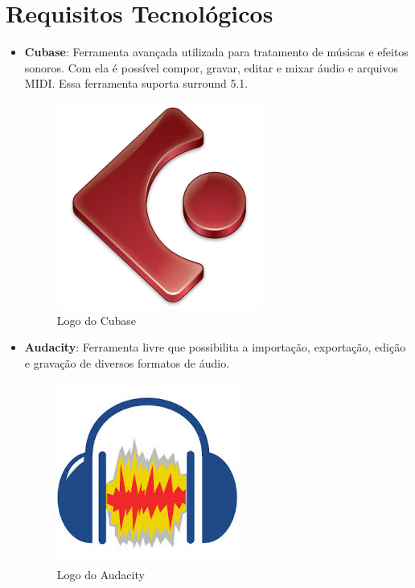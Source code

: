 \documentclass[11pt]{article} %
\begin{document}
\section{Requisitos Tecnológicos}

\begin{itemize}

\item \textbf{Cubase}: Ferramenta avançada utilizada para tratamento de músicas e efeitos sonoros. Com ela é possível compor, gravar, editar e mixar áudio e arquivos MIDI. Essa ferramenta suporta surround 5.1.

\begin{figure}[!htp]
\centering
\includegraphics[scale=0.3]{res/cubase-Logo.png}
\caption{Logo do Cubase}
\label{Cubase}
\end{figure}

\newpage
\item \textbf{Audacity}: Ferramenta livre que possibilita a importação, exportação, edição e gravação de diversos formatos de áudio.

\begin{figure}[!htp]
\centering
\includegraphics[scale=0.3]{res/audacity.jpg}
\caption{Logo do Audacity}
\label{Audacity}
\end{figure}


\end{itemize}
\end{document}
